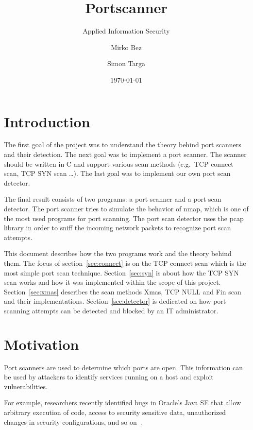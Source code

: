 \documentclass[a4paper]{scrreprt}
\begin{document}
\title{Portscanner}
\subtitle{Applied Information Security}
\author{Mirko Bez \and Simon Targa} 
\date{\today}
\maketitle
\tableofcontents
\newpage



\section*{Introduction}
The first goal of the project was to understand the theory behind port scanners and their detection. The next goal was to implement a port scanner. The scanner should be written in C and support various scan methods (e.g.\ TCP connect scan, TCP SYN scan \dots). The last goal
was to implement our own port scan detector. 

The final result consists of two programs: a port scanner and a port scan detector.
The port scanner tries to simulate the behavior of nmap, which is one of the most used
programs for port scanning. The port scan detector uses the pcap library in order to sniff
the incoming network packets to recognize port scan attempts.

This document describes how the two programs work and the theory behind them.
The focus of section~\ref{sec:connect} is on the TCP connect scan which is the most simple port scan technique. 
Section~\ref{sec:syn} is about how the TCP SYN scan works and how it was implemented within the scope of this project. Section~\ref{sec:xmas} describes the scan methods Xmas, TCP NULL and Fin scan and their
implementations. Section~\ref{sec:detector} is dedicated on how port scanning attempts can be detected and blocked by an IT administrator.

\section*{Motivation}
Port scanners are used to determine which ports are open. This information can be used by
attackers to identify services running on a host and exploit vulnerabilities. 


For example, researchers recently identified bugs in Oracle’s Java SE that allow arbitrary execution of code, access to security sensitive data, unauthorized changes in security configurations, and so on~\cite{dangerports}.







\newpage
\printbibliography
\end{document}
